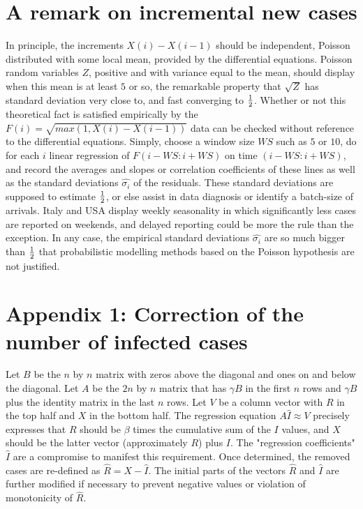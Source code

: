 \documentclass{article}
\begin{document}
\section{A remark on incremental new cases} \label{More}

In principle, the increments $X(i)-X(i-1)$ should be independent, Poisson distributed with some local mean, provided by the differential equations. Poisson random variables $Z$, positive and with variance equal to the mean, should display when this mean is at least $5$ or so, the remarkable property that $\sqrt{Z}$ has standard deviation very close to, and fast converging to ${1 \over 2}$. Whether or not this theoretical fact is satisfied empirically by the $F(i)=\sqrt{max(1,X(i)-X(i-1))}$ data can be checked without reference to the differential equations. Simply, choose a window size $WS$ such as $5$ or $10$, do for each $i$ linear regression of $F(i-WS:i+WS)$ on time $(i-WS:i+WS)$, and record the averages and slopes or correlation coefficients of these lines as well as the standard deviations $\hat{\sigma_i}$ of the residuals. These standard deviations are supposed to estimate ${1 \over 2}$, or else assist in data diagnosis or identify a batch-size of arrivals. Italy and USA display weekly seasonality in which significantly less cases are reported on weekends, and delayed reporting could be more the rule than the exception. In any case, the empirical standard deviations $\hat{\sigma_i}$ are so much bigger than ${1 \over 2}$ that probabilistic modelling methods based on the Poisson hypothesis are not justified.


\section{Appendix 1: Correction of the number of infected cases}

Let $B$ be the $n$ by $n$ matrix with zeros above the diagonal and ones on and below the diagonal. Let $A$ be the $2 n$ by $n$ matrix that has $\gamma B$ in the first $n$ rows and $\gamma B$ plus the identity matrix in the last $n$ rows. Let $V$ be a column vector with $R$ in the top half and $X$ in the bottom half. The regression equation $A \hat{I} \approx V$
precisely expresses that $R$ should be $\beta$ times the cumulative sum of the $I$ values, and $X$ should be the latter vector (approximately $R$) plus $I$. The "regression coefficients" $\hat{I}$ are a compromise to manifest this requirement. Once determined, the removed cases are re-defined as $\hat{R}=X-\hat{I}$. The initial parts of the vectors $\hat{R}$ and $\hat{I}$ are further modified if necessary to prevent negative values or violation of monotonicity of $\hat{R}$.
\end{document}

